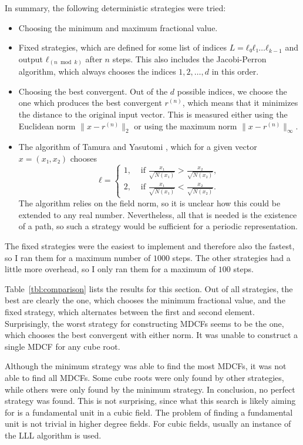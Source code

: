 In summary, the following deterministic strategies were tried:
\begin{itemize}
  \item Choosing the minimum and maximum fractional value.
  \item Fixed strategies,
    which are defined for some list of indices $L = ℓ₀ ℓ₁ \dots ℓ_{k-1}$
    and output $ℓ_{(n \bmod k)}$ after $n$ steps.
    This also includes the Jacobi-Perron algorithm,
    which always chooses the indices $1, 2, …, d$ in this order.
  \item Choosing the best convergent.
    Out of the $d$ possible indices,
    we choose the one which produces the best convergent $r^{(n)}$,
    which means that it minimizes the distance to the original input vector.
    This is measured either using the Euclidean norm $\|x - r^{(n)}\|_2$ or using the maximum norm $\|x - r^{(n)}\|_{\infty}$.
  \item
    The algorithm of Tamura and Yasutomi \cite{Tamura09},
    which for a given vector $x = (x₁, x₂)$ chooses
    \[
      ℓ =
      \begin{cases}
        1, & \text{ if } \frac{x₁}{\sqrt{N(x₁)}} > \frac{x₂}{\sqrt{N(x₂)}}, \\
        2, & \text{ if } \frac{x₁}{\sqrt{N(x₁)}} < \frac{x₂}{\sqrt{N(x₂)}}.
      \end{cases}
    \]
    The algorithm relies on the field norm,
    so it is unclear how this could be extended to any real number.
    Nevertheless, all that is needed is the existence of a path, so such a
    strategy would be sufficient for a periodic representation.
\end{itemize}
The fixed strategies were the easiest to implement and therefore also the
fastest, so I ran them for a maximum number of $1000$ steps.
The other strategies had a little more overhead, so I only ran them for a
maximum of $100$ steps.

Table~\ref{tbl:comparison} lists the results for this section.
Out of all strategies, the best are clearly the one,
which chooses the minimum fractional value, and the fixed strategy, which
alternates between the first and second element.
Surprisingly, the worst strategy for constructing MDCFs seems to be the one,
which chooses the best convergent with either norm.
It was unable to construct a single MDCF for any cube root.

Although the minimum strategy was able to find the most MDCFs,
it was not able to find all MDCFs.
Some cube roots were only found by other strategies,
while others were only found by the minimum strategy.
In conclusion, no perfect strategy was found.
This is not surprising,
since what this search is likely aiming for is a fundamental unit in a cubic field.
The problem of finding a fundamental unit is not trivial in higher degree fields. %
For cubic fields, usually an instance of the LLL algorithm is used.
